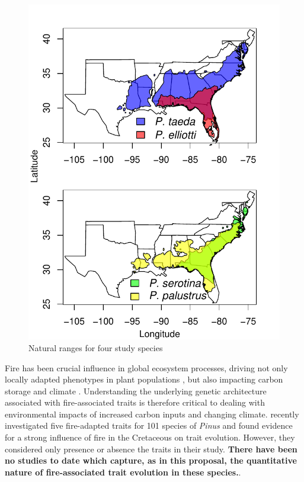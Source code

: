 \begin{figure}
\vspace{-30pt}
\centering
\includegraphics[scale=0.7]{rangemap}
\caption{Natural ranges for four study species}
\label{f:range}
\vspace{-10pt}
\end{figure}


Fire has been crucial influence in global ecosystem processes, driving not only locally adapted phenotypes in plant populations 
\citep{Lamont:1991js,Vega:2008vk,Midgley:2011dw,Keeley:2011jw,He:2012bz,Parchman:2012ca}, 
but also impacting carbon storage and climate \citep{Bowman:2009kp}.  Understanding the underlying genetic architecture 
associated with fire-associated traits is therefore critical to dealing with environmental impacts of increased carbon inputs and 
changing climate.  \citet{He:2012bz} recently investigated five fire-adapted traits for 101 species of \emph{Pinus} and found evidence 
for a strong influence of fire in the Cretaceous on trait evolution.  However, they considered only presence or absence the traits in 
their study.  \textbf{There have been no studies to date which capture, as in this proposal, the quantitative nature of fire-associated trait 
evolution in these species.}.  

